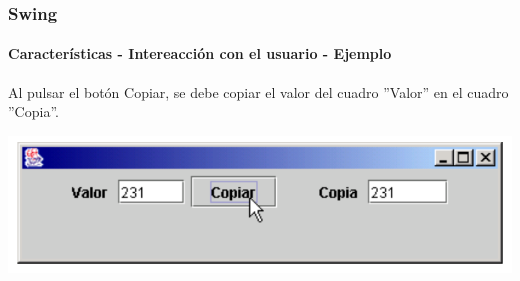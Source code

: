 \documentclass{beamer}
\begin{document}
	\begin{frame}
		\frametitle{Swing}
		\framesubtitle{Caracter\'isticas - Intereacci\'on con el usuario - Ejemplo}

        Al pulsar el bot\'on Copiar, se debe copiar el valor del cuadro ''Valor'' en el cuadro ''Copia''.
        \begin{center}
	        	\includegraphics[scale=.35]{images/copia.png}
	    \end{center}
	\end{frame}

{ %
    \begin{frame}[plain]
    \end{frame}
}
\end{document}
